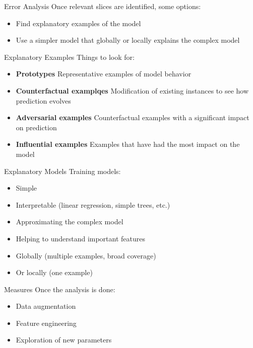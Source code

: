 \begin{frame}{Error Analysis}
  Once relevant slices are identified, some options:

  \begin{itemize}
    \item Find explanatory examples of the model
    \item Use a simpler model that globally or locally explains the
      complex model
  \end{itemize}

  \hugo
\end{frame}


\begin{frame}{Explanatory Examples}
  Things to look for:

  \begin{itemize}
    \item \textbf{Prototypes} Representative examples of model behavior
    \item \textbf{Counterfactual examplqes} Modification of existing
      instances to see how prediction evolves
    \item \textbf{Adversarial examples} Counterfactual examples with a
      significant impact on prediction
    \item \textbf{Influential examples} Examples that have had the
      most impact on the model
  \end{itemize}

  \hugo
\end{frame}


\begin{frame}{Explanatory Models}
  Training models:
  \begin{itemize}
    \item Simple
    \item Interpretable (linear regression, simple trees, etc.)
    \item Approximating the complex model
    \item Helping to understand important features
    \item Globally (multiple examples, broad coverage)
    \item Or locally (one example)
  \end{itemize}

  \hugo
\end{frame}


\begin{frame}{Measures}
  Once the analysis is done:

  \begin{itemize}
    \item Data augmentation
    \item Feature engineering
    \item Exploration of new parameters
  \end{itemize}

  \hugo
\end{frame}


